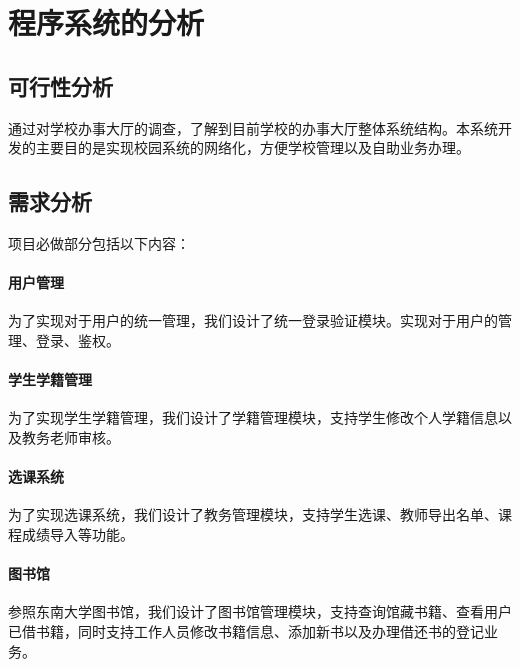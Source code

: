 \documentclass{article}
\begin{document}


\section{程序系统的分析}

\subsection{可行性分析}

通过对学校办事大厅的调查，了解到目前学校的办事大厅整体系统结构。本系统开发的主要目的是实现校园系统的网络化，方便学校管理以及自助业务办理。

\subsection{需求分析}

项目必做部分包括以下内容：

\paragraph{用户管理}
为了实现对于用户的统一管理，我们设计了统一登录验证模块。实现对于用户的管理、登录、鉴权。

\paragraph{学生学籍管理}
为了实现学生学籍管理，我们设计了学籍管理模块，支持学生修改个人学籍信息以及教务老师审核。

\paragraph{选课系统}
为了实现选课系统，我们设计了教务管理模块，支持学生选课、教师导出名单、课程成绩导入等功能。

\paragraph{图书馆}
参照东南大学图书馆，我们设计了图书馆管理模块，支持查询馆藏书籍、查看用户已借书籍，同时支持工作人员修改书籍信息、添加新书以及办理借还书的登记业务。
\end{document}
